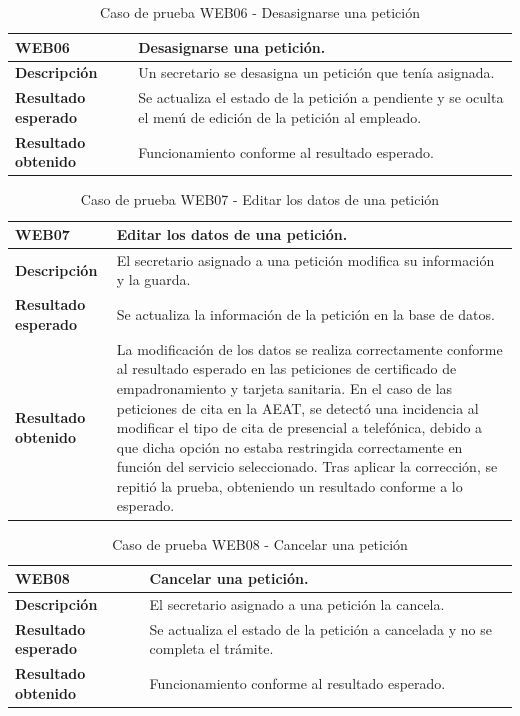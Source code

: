     \begin{table}[H]
        \centering
        \begin{tabular}{|l|p{12cm}|}
        \hline
        \textbf{WEB06} & Desasignarse una petición. \\ \hline
        \textbf{Descripción} & Un secretario se desasigna un petición que tenía asignada. \\ \hline
        \textbf{Resultado esperado} & Se actualiza el estado de la petición a pendiente y se oculta el menú de edición de la petición al empleado. \\ \hline
        \textbf{Resultado obtenido} & Funcionamiento conforme al resultado esperado. \\ \hline
        \end{tabular}
        \caption{Caso de prueba WEB06 - Desasignarse una petición}
    \end{table}

    \begin{table}[H]
        \centering
        \begin{tabular}{|l|p{12cm}|}
        \hline
        \textbf{WEB07} & Editar los datos de una petición. \\ \hline
        \textbf{Descripción} & El secretario asignado a una petición modifica su información y la guarda. \\ \hline
        \textbf{Resultado esperado} & Se actualiza la información de la petición en la base de datos. \\ \hline
        \textbf{Resultado obtenido} & La modificación de los datos se realiza correctamente conforme al resultado esperado en las peticiones de certificado de empadronamiento y tarjeta sanitaria. 
            En el caso de las peticiones de cita en la AEAT, se detectó una incidencia al modificar el tipo de cita de presencial a telefónica, debido a que dicha opción no estaba restringida correctamente en función del servicio seleccionado. 
            Tras aplicar la corrección, se repitió la prueba, obteniendo un resultado conforme a lo esperado. \\ \hline
        \end{tabular}
        \caption{Caso de prueba WEB07 - Editar los datos de una petición}
    \end{table}

    \begin{table}[H]
        \centering
        \begin{tabular}{|l|p{12cm}|}
        \hline
        \textbf{WEB08} & Cancelar una petición. \\ \hline
        \textbf{Descripción} & El secretario asignado a una petición la cancela. \\ \hline
        \textbf{Resultado esperado} & Se actualiza el estado de la petición a cancelada y no se completa el trámite. \\ \hline
        \textbf{Resultado obtenido} & Funcionamiento conforme al resultado esperado. \\ \hline
        \end{tabular}
        \caption{Caso de prueba WEB08 - Cancelar una petición}
    \end{table}

